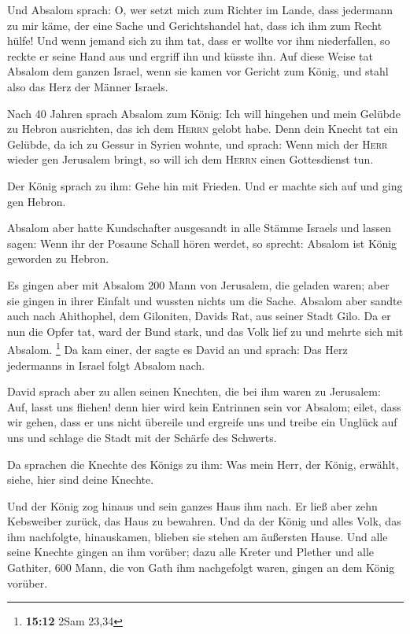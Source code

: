  Und Absalom sprach: O, wer setzt mich zum Richter im
Lande, dass jedermann zu mir käme, der eine Sache und Gerichtshandel
hat, dass ich ihm zum Recht hülfe!  Und wenn jemand sich
zu ihm tat, dass er wollte vor ihm niederfallen, so reckte er seine Hand
aus und ergriff ihn und küsste ihn.  Auf diese Weise tat
Absalom dem ganzen Israel, wenn sie kamen vor Gericht zum König, und
stahl also das Herz der Männer Israels.

 Nach 40 Jahren sprach Absalom zum König: Ich will
hingehen und mein Gelübde zu Hebron ausrichten, das ich dem
\textsc{Herrn} gelobt habe.  Denn dein Knecht tat ein
Gelübde, da ich zu Gessur in Syrien wohnte, und sprach: Wenn mich der
\textsc{Herr} wieder gen Jerusalem bringt, so will ich dem
\textsc{Herrn} einen Gottesdienst tun.

 Der König sprach zu ihm: Gehe hin mit Frieden. Und er
machte sich auf und ging gen Hebron.

 Absalom aber hatte Kundschafter ausgesandt in alle
Stämme Israels und lassen sagen: Wenn ihr der Posaune Schall hören
werdet, so sprecht: Absalom ist König geworden zu Hebron.

 Es gingen aber mit Absalom 200 Mann von Jerusalem, die
geladen waren; aber sie gingen in ihrer Einfalt und wussten nichts um
die Sache.  Absalom aber sandte auch nach Ahithophel, dem
Giloniten, Davids Rat, aus seiner Stadt Gilo. Da er nun die Opfer tat,
ward der Bund stark, und das Volk lief zu und mehrte sich mit Absalom.
\footnote{\textbf{15:12} 2Sam 23,34}  Da kam einer, der
sagte es David an und sprach: Das Herz jedermanns in Israel folgt
Absalom nach.

 David sprach aber zu allen seinen Knechten, die bei ihm
waren zu Jerusalem: Auf, lasst uns fliehen! denn hier wird kein
Entrinnen sein vor Absalom; eilet, dass wir gehen, dass er uns nicht
übereile und ergreife uns und treibe ein Unglück auf uns und schlage die
Stadt mit der Schärfe des Schwerts.

 Da sprachen die Knechte des Königs zu ihm: Was mein
Herr, der König, erwählt, siehe, hier sind deine Knechte.

 Und der König zog hinaus und sein ganzes Haus ihm nach.
Er ließ aber zehn Kebsweiber zurück, das Haus zu bewahren.
 Und da der König und alles Volk, das ihm nachfolgte,
hinauskamen, blieben sie stehen am äußersten Hause.  Und
alle seine Knechte gingen an ihm vorüber; dazu alle Kreter und Plether
und alle Gathiter, 600 Mann, die von Gath ihm nachgefolgt waren, gingen
an dem König vorüber.


